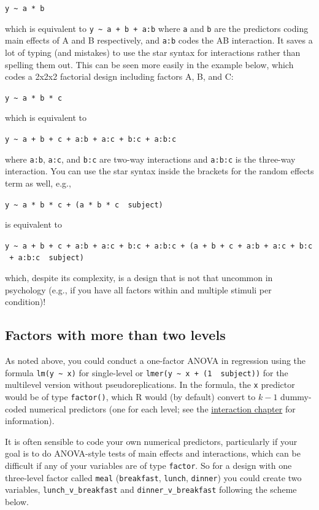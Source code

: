 \documentclass[]{book}
\begin{document}
\texttt{y\ \textasciitilde{}\ a\ *\ b}

which is equivalent to \texttt{y\ \textasciitilde{}\ a\ +\ b\ +\ a:b} where \texttt{a} and \texttt{b} are the predictors coding main effects of A and B respectively, and \texttt{a:b} codes the AB interaction. It saves a lot of typing (and mistakes) to use the star syntax for interactions rather than spelling them out. This can be seen more easily in the example below, which codes a 2x2x2 factorial design including factors A, B, and C:

\texttt{y\ \textasciitilde{}\ a\ *\ b\ *\ c}

which is equivalent to

\texttt{y\ \textasciitilde{}\ a\ +\ b\ +\ c\ +\ a:b\ +\ a:c\ +\ b:c\ +\ a:b:c}

where \texttt{a:b}, \texttt{a:c}, and \texttt{b:c} are two-way interactions and \texttt{a:b:c} is the three-way interaction. You can use the star syntax inside the brackets for the random effects term as well, e.g.,

\texttt{y\ \textasciitilde{}\ a\ *\ b\ *\ c\ +\ (a\ *\ b\ *\ c\ \textbar{}\ subject)}

is equivalent to

\texttt{y\ \textasciitilde{}\ a\ +\ b\ +\ c\ +\ a:b\ +\ a:c\ +\ b:c\ +\ a:b:c\ +\ (a\ +\ b\ +\ c\ +\ a:b\ +\ a:c\ +\ b:c\ +\ a:b:c\ \textbar{}\ subject)}

which, despite its complexity, is a design that is not that uncommon in psychology (e.g., if you have all factors within and multiple stimuli per condition)!

\hypertarget{factors-with-more-than-two-levels}{%
\subsection{Factors with more than two levels}\label{factors-with-more-than-two-levels}}

As noted above, you could conduct a one-factor ANOVA in regression using the formula \texttt{lm(y\ \textasciitilde{}\ x)} for single-level or \texttt{lmer(y\ \textasciitilde{}\ x\ +\ (1\ \textbar{}\ subject))} for the multilevel version without pseudoreplications. In the formula, the \texttt{x} predictor would be of type \texttt{factor()}, which R would (by default) convert to \(k-1\) dummy-coded numerical predictors (one for each level; see the \href{interactions.html}{interaction chapter} for information).

It is often sensible to code your own numerical predictors, particularly if your goal is to do ANOVA-style tests of main effects and interactions, which can be difficult if any of your variables are of type \texttt{factor}. So for a design with one three-level factor called \texttt{meal} (\texttt{breakfast}, \texttt{lunch}, \texttt{dinner}) you could create two variables, \texttt{lunch\_v\_breakfast} and \texttt{dinner\_v\_breakfast} following the scheme below.
\end{document}
